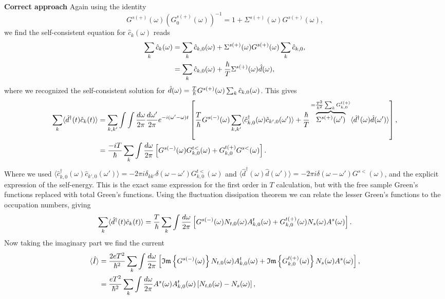 \textbf{Correct approach} Again using the identity 
\begin{equation}
    G^{s(+)}(\omega)\left(G^{s(+)}_0(\omega)\right)^{-1} = 1+\Sigma^{s(+)}(\omega)G^{s(+)}(\omega), 
\end{equation}
we find the self-consistent equation for $\hat{c}_k(\omega)$ reads
\begin{align}
    \sum_k\hat{c}_k(\omega) &= \sum_k \hat{c}_{k,0}(\omega) + \Sigma^{s(+)}(\omega)G^{s(+)}(\omega)\sum_k\hat{c}_{k,0},\nonumber\\
    &=\sum_k \hat{c}_{k,0}(\omega)+\frac{\hbar}{T}\Sigma^{s(+)}(\omega)\hat{d}(\omega),
\end{align}
where we recognized the self-consistent solution for $\hat{d}(\omega) = \frac{T}{\hbar}G^{s(+)}(\omega)\sum_k\hat{c}_{k,0}(\omega)$. This gives
\begin{align}
    \sum_k \langle{\hat{d}^\dagger(t)\hat{c}_k(t)}\rangle &= \sum_{k,k'}\int\int\frac{d\omega}{2\pi}\frac{d\omega'}{2\pi}e^{-i(\omega'-\omega)t} \left[\frac{T}{\hbar}G^{s(-)}(\omega)\sum_{k,k'}\langle \hat{c}^\dagger_{k,0}(\omega)\hat{c}_{k',0}(\omega')\rangle+\frac{\hbar}{T}\overbrace{\Sigma^{s(+)}(\omega')}^{=\frac{T^2}{\hbar^2}\sum_kG^{t(+)}_{k,0}}\langle \hat{d}^\dagger(\omega)\hat{d}(\omega')\rangle\right],\nonumber\\
    &= \frac{-iT}{\hbar}\sum_k\int\frac{d\omega}{2\pi}\left[G^{s(-)}(\omega)G^{t<}_{k,0}(\omega)+G^{t(+)}_{k,0}G^{s<}(\omega)\right].
\end{align}
Where we used $\langle \hat{c}^\dagger_{k,0}(\omega)\hat{c}_{k',0}(\omega')\rangle = -2\pi i \delta_{kk'}\delta(\omega-\omega')G^{t<}_{k,0}(\omega)$ and $\langle \hat{d}^\dagger(\omega)\hat{d}(\omega')\rangle = -2\pi i \delta(\omega-\omega') G^{s<}(\omega)$, and the explicit expression of the self-energy. This is the exact same expression for the first order in $T$ calculation, but with the free sample Green's functions replaced with total Green's functions. Using the fluctuation dissipation theorem we can relate the lesser Green's functions to the occupation numbers, giving
\begin{equation}
    \sum_k \langle{\hat{d}^\dagger(t)\hat{c}_k(t)}\rangle = \frac{T}{\hbar}\sum_k\int\frac{d\omega}{2\pi}\left[G^{s(-)}(\omega)N_{t,0}(\omega)A^t_{k,0}(\omega)+G^{t(+)}_{k,0}(\omega)N_s(\omega)A^s(\omega)\right].
\end{equation}
Now taking the imaginary part we find the current
\begin{align}
    \langle\hat{I}\rangle &= \frac{2 e T^2}{\hbar^2}\sum_k\int\frac{d\omega}{2\pi}\left[\mathfrak{Im}\left\{G^{s(-)}(\omega)\right\}N_{t,0}(\omega)A^t_{k,0}(\omega)+\mathfrak{Im}\left\{G^{t(+)}_{k,0}(\omega)\right\}N_s(\omega)A^s(\omega)\right],\nonumber\\
    &= \frac{eT^2}{\hbar^2}\sum_k\int\frac{d\omega}{2\pi}A^s(\omega)A^t_{k,0}(\omega)\left[N_{t,0}(\omega)-N_s(\omega)\right]\nonumber,
\end{align}
